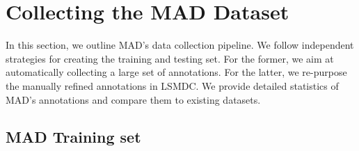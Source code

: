 \documentclass[10pt,twocolumn,letterpaper]{article}
\begin{document}
 \section{Collecting the MAD Dataset}\label{sec: method}

In this section, we outline MAD's data collection pipeline. We follow independent strategies for creating the training and testing set. For the former, we aim at automatically collecting a large set of annotations. For the latter, we re-purpose the manually refined annotations in LSMDC. We provide detailed statistics of MAD's annotations and compare them to existing  datasets.

\subsection{MAD Training set}
\label{section::train-set}
\end{document}
